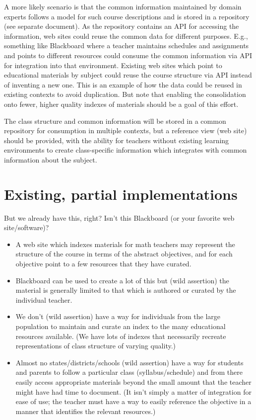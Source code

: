 A more likely scenario is that the common information maintained by domain
experts follows a model for such course descriptions and is stored in a
repository (see separate document).  As the repository contains an API
for accessing the information, web sites could reuse the common data for
different purposes.  E.g., something like Blackboard where a teacher maintains
schedules and assignments and points to different resources could consume
the common information via API for integration into that environment.
Existing web sites which point to educational materials by subject could
reuse the course structure via API instead of inventing a new one.  This 
is an example of how the
data could be reused in existing contexts to avoid duplication.  But
note that enabling the consolidation onto fewer, higher quality indexes of
materials should be a goal of this effort.

The class structure and common information will be stored in a common
repository for consumption in multiple contexts, but a reference view (web
site) should be provided, with the ability for teachers without existing
learning environments to create class-specific information which integrates
with common information about the subject.

\section*{Existing, partial implementations}

But we already have this, right?  Isn't this Blackboard (or your favorite
web site/software)?

\begin{itemize}
\item A web site which indexes materials for math teachers may represent the structure
of the course in terms of the abstract objectives, and for each objective point
to a few resources that they have curated.
\item Blackboard can be used to create a lot of this but (wild assertion) the
material is generally limited to that which is authored or curated by the
individual teacher.
\item We don't (wild assertion) have a way for individuals from the large population to maintain and curate
an index to the many educational resources available.  (We have lots of indexes that
necessarily recreate representations of class structure of varying quality.)
\item Almost no states/districts/schools (wild assertion) have a way
for students and parents to follow a particular class (syllabus/schedule) and
from there easily access appropriate materials beyond the small amount that the
teacher might have had time to document.  (It isn't simply a matter of integration
for ease of use; the teacher must have a way to easily reference the objective in 
a manner that identifies the relevant resources.)
\end{itemize}


